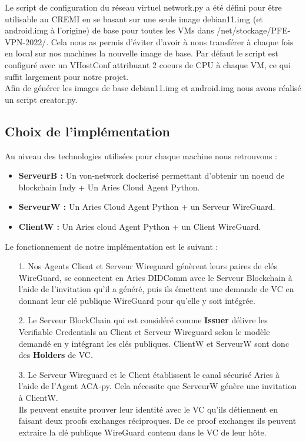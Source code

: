 \documentclass[12pt, openany]{report}
\begin{document}
\begin{flushleft}
Le script de configuration du réseau virtuel network.py a été défini pour être utilisable au CREMI en se basant sur une seule image debian11.img (et android.img à l'origine) de base pour toutes les VMs dans /net/stockage/PFE-VPN-2022/. Cela nous as permis d'éviter d'avoir à nous transférer à chaque fois en local sur nos machines la nouvelle image de base. Par défaut le script est configuré avec un VHostConf attribuant 2 coeurs de CPU à chaque VM, ce qui suffit largement pour notre projet.\\
Afin de générer les images de base debian11.img et android.img nous avons réalisé un script creator.py.

\subsection{Choix de l'implémentation}

Au niveau des technologies utilisées pour chaque machine nous retrouvons :\\
\begin{itemize}
\item \textbf{ServeurB :} Un von-network dockerisé permettant d'obtenir un noeud de blockchain Indy + Un Aries Cloud Agent Python.
\item \textbf{ServeurW :} Un Aries Cloud Agent Python + un Serveur WireGuard.
\item \textbf{ClientW :} Un Aries cloud Agent Python + un Client WireGuard.
\end{itemize}
Le fonctionnement de notre implémentation est le suivant : 

\begin{itemize}
\color{green}
\item[1.] \color{black} Nos Agents Client et Serveur Wireguard génèrent leurs paires de clés WireGuard, se connectent en Aries DIDComm avec le Serveur Blockchain à l'aide de l'invitation qu'il a généré, puis ils émettent une demande de VC en donnant leur clé publique WireGuard pour qu'elle y soit intégrée.

\color{orange}
\item[2.] \color{black} Le Serveur BlockChain qui est considéré comme \textbf{Issuer} délivre les Verifiable Credentials au Client et Serveur Wireguard selon le modèle demandé en y intégrant les clés publiques. ClientW et ServeurW sont donc des \textbf{Holders} de VC.

\color{violet}
\item[3.] \color{black} Le Serveur Wireguard et le Client établissent le canal sécurisé Aries à l’aide de l’Agent ACA-py. Cela nécessite que ServeurW génère une invitation à ClientW.\\
Ils peuvent ensuite prouver leur identité avec le VC qu’ils détiennent en faisant deux proofs exchanges réciproques. De ce proof exchanges ils peuvent extraire la clé publique WireGuard contenu dans le VC de leur hôte.


\end{itemize}
\end{flushleft}
\end{document}

